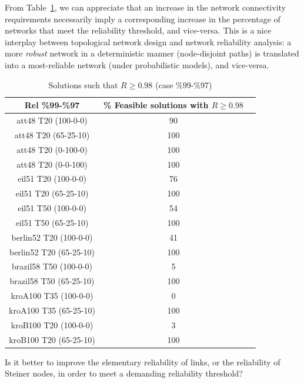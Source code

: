 From Table~\ref{answer3}, we can appreciate that an increase in the network connectivity requirements 
necessarily imply a corresponding increase in the percentage of networks that meet the reliability 
threshold, and vice-versa. This is a nice interplay between topological network design and network 
reliability analysis: a more \emph{robust} network in a deterministic manner (node-disjoint paths) 
is translated into a most-reliable network (under probabilistic models), and vice-versa.  

\begin{table}
\caption{Solutions such that $R \geq 0.98$ (case \%99-\%97)} %
\centering  %
\begin{tabular}{|c|c|c|} %
\hline	Rel \%99-\%97   &	\% Feasible solutions with $R \geq 0.98$ \\
\hline	att48 T20 (100-0-0)	&	90	\\
\hline	att48 T20 (65-25-10)	&	100	\\
\hline	att48 T20 (0-100-0)	&	100	\\
\hline	att48 T20 (0-0-100)	&	100	\\
\hline	eil51 T20 (100-0-0)	&	76	\\
\hline	eil51 T20 (65-25-10)	&	100	\\
\hline	eil51 T50 (100-0-0)	&	54	\\
\hline	eil51 T50 (65-25-10)	&	100	\\
\hline	berlin52 T20 (100-0-0)	&	41	\\
\hline	berlin52 T20 (65-25-10)	&	100	\\
\hline	brazil58 T50 (100-0-0)	&	5	\\
\hline	brazil58 T50 (65-25-10)	&	100	\\
\hline	kroA100 T35 (100-0-0)	&	0	\\
\hline	kroA100 T35 (65-25-10)	&	100	\\
\hline	kroB100 T20 (100-0-0)	&	3	\\
\hline	kroB100 T20 (65-25-10)	&	100	\\
\hline
\end{tabular}
\label{answer3} %
\end{table}

\begin{question}
Is it better to  improve the elementary reliability of links, or the reliability of Steiner nodes, in order to meet a demanding reliability threshold? 
\end{question}

